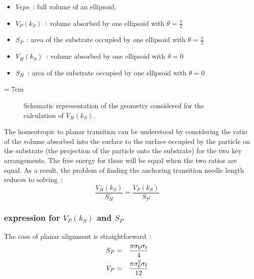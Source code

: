 \begin{itemize}
        \item $Veps$~: full volume of an ellipsoid.
	\item $V_P(k_S)$~: volume absorbed by one ellipsoid with $\theta=\frac{\pi}{2}$
	\item $S_P$~: area of the substrate occupied by one ellipsoid with $\theta=\frac{\pi}{2}$
	\item $V_H(k_S)$~: volume absorbed by one ellipsoid with $\theta=0$
        \item $S_H$~: area of the substrate occupied by one ellipsoid with $\theta=0$
\end{itemize}

\picW = 7cm
\begin{figure}[h]
	\centering
	\caption{Schematic representation of the geometry considered for the 
	calculation of $V_H(k_S)$.}
	\label{fig:HPTransTheory_f3}
\end{figure}

The homeotropic to planar transition can be understood by considering the ratio of the volume
absorbed into the surface to the surface occupied by the particle on the substrate (\ie the
projection of the particle onto the substrate) for the two key arrangements. The free energy  
for these will be equal when the two ratios are equal. 
As a result, the problem of finding the anchoring transition needle length reduces to solving~:
%
\begin{equation}
        \frac{V_H(k_S)}{S_H} = \frac{V_P(k_S)}{S_P}
	\label{eqn:P-Htransition}
\end{equation}

\subsubsection{expression for $V_P(k_S)$ and $S_P$}
The case of planar alignment is straightforward~:
%
\begin{eqnarray}
        S_P &=& \frac{\pi\sigma_0\sigma_\ell}{4}\\
        V_P &=& \frac{\pi\sigma_0^2\sigma_\ell}{12}
\end{eqnarray}


